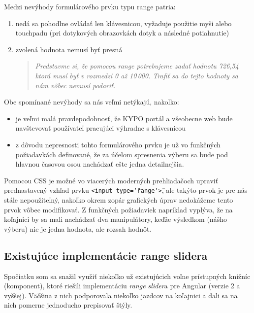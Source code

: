 \documentclass[
  digital, %
  twoside, %
  notable,   %
  nolof,   %
  nolot,   %
]{fithesis3}
\begin{document}
Medzi nevýhody formulárového prvku typu range patria:
\begin{enumerate}
\item nedá sa pohodlne ovládať len klávesnicou, vyžaduje použitie myši alebo touchpadu (pri dotykových obrazovkách dotyk a následné potiahnutie)
\item zvolená hodnota nemusí byť presná
\begin{quote}
\textit{Predstavme si, že pomocou range potrebujeme zadať hodnotu 726,54 ktorá musí byť v rozmedzí 0 až 10\,000. Trafiť sa do tejto hodnoty sa nám vôbec nemusí podariť.}
\end{quote}
\end{enumerate}

Obe spomínané nevýhody sa nás veľmi netýkajú, nakoľko:
\begin{itemize}
\item je veľmi malá pravdepodobnosť, že KYPO portál a všeobecne web bude navštevovať používateľ pracujúci výhradne s klávesnicou
\item z dôvodu nepresnosti tohto formulárového prvku je už vo funkčných požiadavkách definované, že za účelom spresnenia výberu sa bude pod hlavnou časovou osou nachádzať ešte jedna detailnejšia.
\end{itemize}

Pomocou CSS je možné vo viacerých moderných prehliadačoch upraviť prednastavený vzhľad prvku \texttt{<input type=\char`\"range\char`\">}, ale takýto prvok je pre nás stále nepoužiteľný, nakoľko okrem zopár grafických úprav nedokážeme tento prvok vôbec modifikovať. Z funkčných požiadaviek napríklad vyplýva, že na koľajnici by sa mali nachádzať dva manipulátory, keďže výsledkom (nášho výberu) nie je jedna hodnota, ale rozsah hodnôt.

\subsection{Existujúce implementácie range slidera}
Spočiatku som sa snažil využiť niekoľko už existujúcich voľne prístupných knižníc (komponent), ktoré riešili implementáciu \textit{range slider}a pre Angular (verzie 2 a vyššej). Väčšina z nich podporovala niekoľko jazdcov na koľajnici a dali sa na nich pomerne jednoducho prepisovať štýly.
\end{document}
